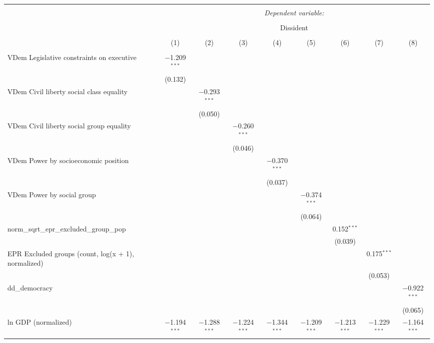 
\begin{sidewaystable}[!htbp] \centering 
  \caption{} 
  \label{} 
\tiny 
\begin{tabular}{@{\extracolsep{5pt}}lcccccccc} 
\\[-1.8ex]\hline 
\hline \\[-1.8ex] 
 & \multicolumn{8}{c}{\textit{Dependent variable:}} \\ 
\cline{2-9} 
\\[-1.8ex] & \multicolumn{8}{c}{Dissident} \\ 
\\[-1.8ex] & (1) & (2) & (3) & (4) & (5) & (6) & (7) & (8)\\ 
\hline \\[-1.8ex] 
 VDem Legislative constraints on executive & $-$1.209$^{***}$ &  &  &  &  &  &  &  \\ 
  & (0.132) &  &  &  &  &  &  &  \\ 
  VDem Civil liberty social class equality &  & $-$0.293$^{***}$ &  &  &  &  &  &  \\ 
  &  & (0.050) &  &  &  &  &  &  \\ 
  VDem Civil liberty social group equality &  &  & $-$0.260$^{***}$ &  &  &  &  &  \\ 
  &  &  & (0.046) &  &  &  &  &  \\ 
  VDem Power by socioeconomic position &  &  &  & $-$0.370$^{***}$ &  &  &  &  \\ 
  &  &  &  & (0.037) &  &  &  &  \\ 
  VDem Power by social group &  &  &  &  & $-$0.374$^{***}$ &  &  &  \\ 
  &  &  &  &  & (0.064) &  &  &  \\ 
  norm\_sqrt\_epr\_excluded\_group\_pop &  &  &  &  &  & 0.152$^{***}$ &  &  \\ 
  &  &  &  &  &  & (0.039) &  &  \\ 
  EPR Excluded groups (count, log(x + 1), normalized) &  &  &  &  &  &  & 0.175$^{***}$ &  \\ 
  &  &  &  &  &  &  & (0.053) &  \\ 
  dd\_democracy &  &  &  &  &  &  &  & $-$0.922$^{***}$ \\ 
  &  &  &  &  &  &  &  & (0.065) \\ 
  ln GDP (normalized) & $-$1.194$^{***}$ & $-$1.288$^{***}$ & $-$1.224$^{***}$ & $-$1.344$^{***}$ & $-$1.209$^{***}$ & $-$1.213$^{***}$ & $-$1.229$^{***}$ & $-$1.164$^{***}$ \\ 

\end{tabular}
\end{sidewaystable}

